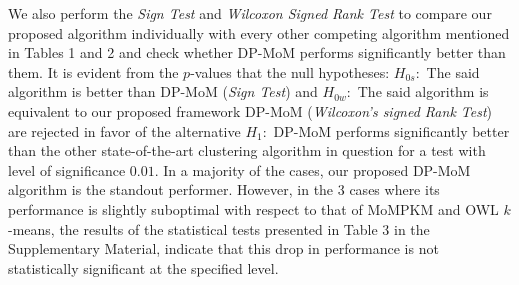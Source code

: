 \documentclass{article}
\begin{document}
We also perform the \textit{Sign Test} and \textit{Wilcoxon Signed Rank Test} to compare our proposed algorithm individually with every other competing algorithm mentioned in Tables 1 and 2 and check whether DP-MoM performs significantly better than them. It is evident from the $p$-values that the null hypotheses: $H_{0s}:$ The said algorithm is better than DP-MoM (\textit{Sign Test}) and $H_{0w}:$ The said algorithm is equivalent to our proposed framework DP-MoM (\textit{Wilcoxon's signed Rank Test}) are rejected in favor of the alternative $H_1:$ DP-MoM performs significantly better than the other state-of-the-art clustering algorithm in question for a test with level of significance $0.01$. In a majority of the cases, our proposed DP-MoM algorithm is the standout performer. However, in the 3 cases where its performance is slightly suboptimal with respect to that of MoMPKM and OWL $k$-means, the results of the statistical tests presented in Table 3 in the Supplementary Material, indicate that this drop in performance is not statistically significant at the specified level.

\end{document}
